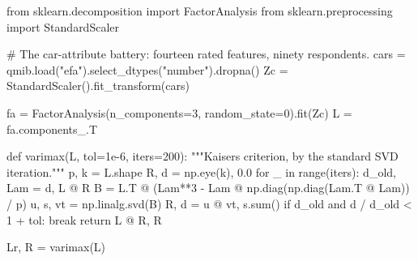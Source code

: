 \documentclass[
  letterpaper,
  10pt,
  twoside,
  openright,
  numbers=noenddot,
  chapterprefix=true]{scrbook}
\newenvironment{Shaded}{}{}
\newcommand{\BuiltInTok}[1]{\textcolor[rgb]{0.84,0.23,0.29}{#1}}
\newcommand{\CommentTok}[1]{\textcolor[rgb]{0.42,0.45,0.49}{#1}}
\newcommand{\ControlFlowTok}[1]{\textcolor[rgb]{0.84,0.23,0.29}{#1}}
\newcommand{\DecValTok}[1]{\textcolor[rgb]{0.00,0.36,0.77}{#1}}
\newcommand{\FloatTok}[1]{\textcolor[rgb]{0.00,0.36,0.77}{#1}}
\newcommand{\ImportTok}[1]{\textcolor[rgb]{0.01,0.18,0.38}{#1}}
\newcommand{\KeywordTok}[1]{\textcolor[rgb]{0.84,0.23,0.29}{#1}}
\newcommand{\NormalTok}[1]{\textcolor[rgb]{0.14,0.16,0.18}{#1}}
\newcommand{\OperatorTok}[1]{\textcolor[rgb]{0.14,0.16,0.18}{#1}}
\newcommand{\StringTok}[1]{\textcolor[rgb]{0.01,0.18,0.38}{#1}}
\begin{document}
\label{check-rotation}
\begin{Shaded}
\begin{Highlighting}[]
\ImportTok{from}\NormalTok{ sklearn.decomposition }\ImportTok{import}\NormalTok{ FactorAnalysis}
\ImportTok{from}\NormalTok{ sklearn.preprocessing }\ImportTok{import}\NormalTok{ StandardScaler}

\CommentTok{\# The car{-}attribute battery: fourteen rated features, ninety respondents.}
\NormalTok{cars }\OperatorTok{=}\NormalTok{ qmib.load(}\StringTok{"efa"}\NormalTok{).select\_dtypes(}\StringTok{"number"}\NormalTok{).dropna()}
\NormalTok{Zc }\OperatorTok{=}\NormalTok{ StandardScaler().fit\_transform(cars)}

\NormalTok{fa }\OperatorTok{=}\NormalTok{ FactorAnalysis(n\_components}\OperatorTok{=}\DecValTok{3}\NormalTok{, random\_state}\OperatorTok{=}\DecValTok{0}\NormalTok{).fit(Zc)}
\NormalTok{L }\OperatorTok{=}\NormalTok{ fa.components\_.T}


\KeywordTok{def}\NormalTok{ varimax(L, tol}\OperatorTok{=}\FloatTok{1e{-}6}\NormalTok{, iters}\OperatorTok{=}\DecValTok{200}\NormalTok{):}
    \CommentTok{"""Kaiser\textquotesingle{}s criterion, by the standard SVD iteration."""}
\NormalTok{    p, k }\OperatorTok{=}\NormalTok{ L.shape}
\NormalTok{    R, d }\OperatorTok{=}\NormalTok{ np.eye(k), }\FloatTok{0.0}
    \ControlFlowTok{for}\NormalTok{ \_ }\KeywordTok{in} \BuiltInTok{range}\NormalTok{(iters):}
\NormalTok{        d\_old, Lam }\OperatorTok{=}\NormalTok{ d, L }\OperatorTok{@}\NormalTok{ R}
\NormalTok{        B }\OperatorTok{=}\NormalTok{ L.T }\OperatorTok{@}\NormalTok{ (Lam}\OperatorTok{**}\DecValTok{3} \OperatorTok{{-}}\NormalTok{ Lam }\OperatorTok{@}\NormalTok{ np.diag(np.diag(Lam.T }\OperatorTok{@}\NormalTok{ Lam)) }\OperatorTok{/}\NormalTok{ p)}
\NormalTok{        u, s, vt }\OperatorTok{=}\NormalTok{ np.linalg.svd(B)}
\NormalTok{        R, d }\OperatorTok{=}\NormalTok{ u }\OperatorTok{@}\NormalTok{ vt, s.}\BuiltInTok{sum}\NormalTok{()}
        \ControlFlowTok{if}\NormalTok{ d\_old }\KeywordTok{and}\NormalTok{ d }\OperatorTok{/}\NormalTok{ d\_old }\OperatorTok{\textless{}} \DecValTok{1} \OperatorTok{+}\NormalTok{ tol:}
            \ControlFlowTok{break}
    \ControlFlowTok{return}\NormalTok{ L }\OperatorTok{@}\NormalTok{ R, R}


\NormalTok{Lr, R }\OperatorTok{=}\NormalTok{ varimax(L)}


\end{Highlighting}
\end{Shaded}
\end{document}
